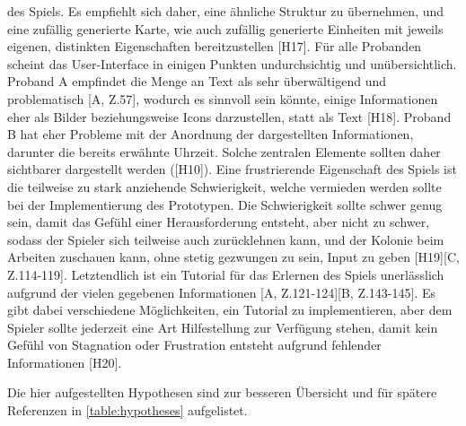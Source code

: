 des Spiels. Es empfiehlt sich daher, eine ähnliche Struktur zu übernehmen, und eine zufällig generierte Karte, wie auch zufällig generierte Einheiten mit jeweils eigenen, distinkten Eigenschaften bereitzustellen [H17]. Für alle Probanden scheint das User-Interface in einigen Punkten undurchsichtig und unübersichtlich. Proband A empfindet die Menge an Text als sehr überwältigend und problematisch [A, Z.57], wodurch es sinnvoll sein könnte, einige Informationen eher als Bilder beziehungsweise Icons darzustellen, statt als Text [H18]. Proband B hat eher Probleme mit der Anordnung der dargestellten Informationen, darunter die bereits erwähnte Uhrzeit. Solche zentralen Elemente sollten daher sichtbarer dargestellt werden ([H10]). Eine frustrierende Eigenschaft des Spiels ist die teilweise zu stark anziehende Schwierigkeit, welche vermieden werden sollte bei der Implementierung des Prototypen. Die Schwierigkeit sollte schwer genug sein, damit das Gefühl einer Herausforderung entsteht, aber nicht zu schwer, sodass der Spieler sich teilweise auch zurücklehnen kann, und der Kolonie beim Arbeiten zuschauen kann, ohne stetig gezwungen zu sein, Input zu geben [H19][C, Z.114-119]. Letztendlich ist ein Tutorial für das Erlernen des Spiels unerlässlich aufgrund der vielen gegebenen Informationen [A, Z.121-124][B, Z.143-145]. Es gibt dabei verschiedene Möglichkeiten, ein Tutorial zu implementieren, aber dem Spieler sollte jederzeit eine Art Hilfestellung zur Verfügung stehen, damit kein Gefühl von Stagnation oder Frustration entsteht aufgrund fehlender Informationen [H20].

Die hier aufgestellten Hypothesen sind zur besseren Übersicht und für spätere Referenzen in \autoref{table:hypotheses} aufgelistet.
 

